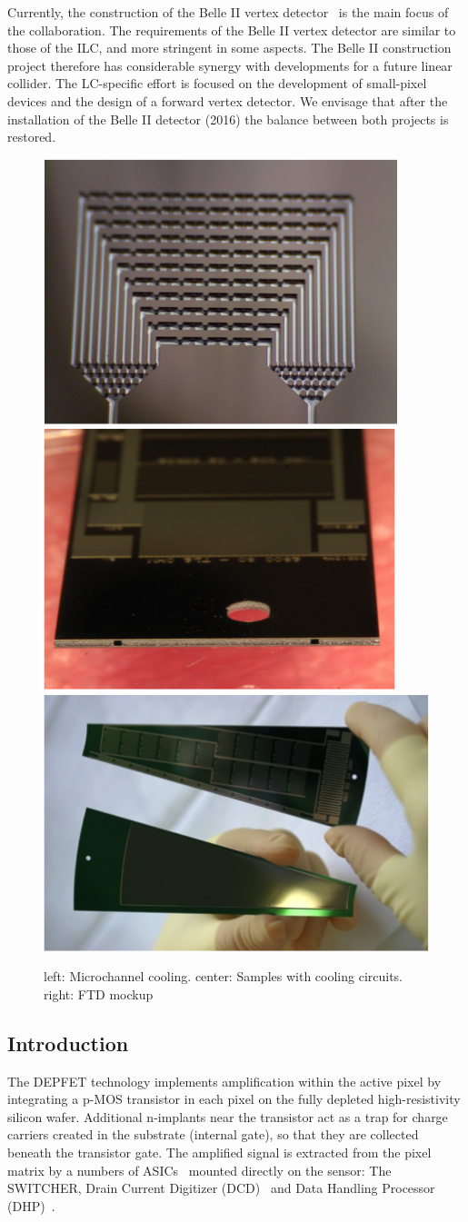 Currently, the construction of the Belle II vertex detector~\cite{Abe:2010gxa} is the main focus of the collaboration. The requirements of the Belle II vertex detector are similar to those of the ILC, and more stringent in some aspects. The Belle II construction project therefore has considerable synergy with developments for a future linear collider. The LC-specific effort is focused on the development of small-pixel devices and the design of a forward vertex detector. We envisage that after the installation of the Belle II detector (2016) the balance between both projects is restored.

\begin{figure}
    \centering
    \includegraphics[width=.3\linewidth]{VertexDetector/DEPFET/microChannel}
    \includegraphics[width=.3\linewidth]{VertexDetector/DEPFET/microChannelSamples}
    \includegraphics[width=.3\linewidth]{VertexDetector/DEPFET/FTD_Mockup}
    \caption{left: Microchannel cooling. center: Samples with cooling circuits. right: FTD mockup}
    \label{fig:VertexDetector:DEPFET}
\end{figure}

\subsection{Introduction}
The DEPFET technology implements amplification within the active pixel by integrating a p-MOS transistor in each pixel on the fully depleted high-resistivity silicon wafer. Additional n-implants near the transistor act as a trap for charge carriers created in the substrate (internal gate), so that they are collected beneath the transistor gate. The amplified signal is extracted from the pixel matrix by a numbers of ASICs~\cite{Kishishita:2014maa,Krueger2010337} mounted directly on the sensor: The SWITCHER, Drain Current Digitizer (DCD)~\cite{1748-0221-6-01-C01085,5446501} and Data Handling Processor (DHP)~\cite{1748-0221-7-01-C01069}.

